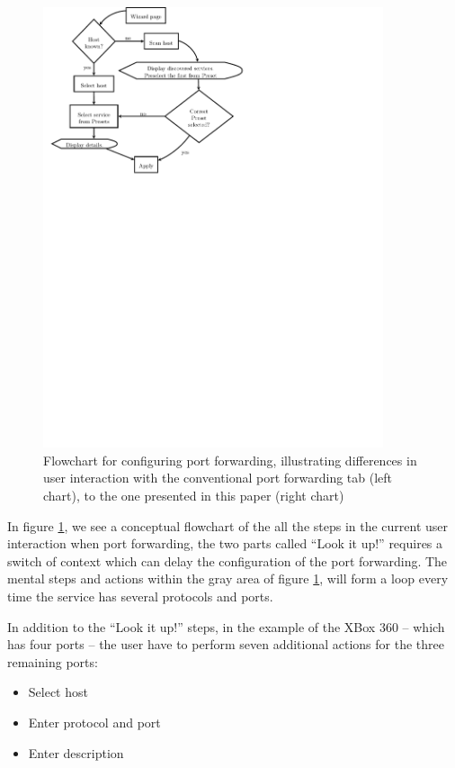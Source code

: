\documentclass[a4paper,11pt,makeidx]{kth-bcs}
\begin{document}
\begin{figure}[h]
\begin{minipage}[b]{0.45\linewidth}
      \includegraphics[trim = 0mm 174mm 80mm 0mm, clip, width=10cm,natwidth=2.570in,natheight=0.580in]{after}
   \end{minipage}
   \caption{Flowchart for configuring port forwarding, illustrating differences in user interaction with the conventional port forwarding tab (left chart), to the one presented in this paper (right chart)}
   \label{fig:usability}
\end{figure}

In figure \ref{fig:usability}, we see a conceptual flowchart of the all the steps in the current user interaction when port forwarding, the two parts called ``Look it up!'' requires a switch of context which can delay the configuration of the port forwarding.
The mental steps and actions within the gray area of figure \ref{fig:usability}, will form a loop every time the service has several protocols and ports.

In addition to the ``Look it up!'' steps, in the example of the XBox 360 -- which has four ports -- the user have to perform seven additional actions for the three remaining ports:
\begin{itemize}
   \item Select host
   \item Enter protocol and port
   \item Enter description
\end{itemize}
\end{document}
